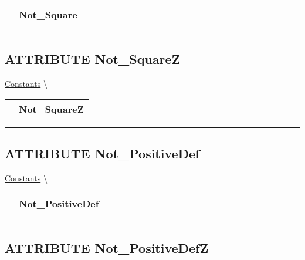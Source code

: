 {\renewcommand{\arraystretch}{1.5}
\begin{tabularx}{\textwidth}{|>{\raggedright\arraybackslash}l|X|}
\hline
\hspace{0pt}\mytexttt{\color{red} } & \textbf{Not\_Square} \\
\hline
\end{tabularx}
}

\par


\rule{\linewidth}{0.5pt}
\subsection*{\textsf{\colorbox{headtoc}{\color{white} ATTRIBUTE}
Not\_SquareZ}}

\hypertarget{ecldoc:pbblas.constants.not_squarez}{}
\hspace{0pt} \hyperlink{ecldoc:PBblas.Constants}{Constants} \textbackslash 

{\renewcommand{\arraystretch}{1.5}
\begin{tabularx}{\textwidth}{|>{\raggedright\arraybackslash}l|X|}
\hline
\hspace{0pt}\mytexttt{\color{red} } & \textbf{Not\_SquareZ} \\
\hline
\end{tabularx}
}

\par


\rule{\linewidth}{0.5pt}
\subsection*{\textsf{\colorbox{headtoc}{\color{white} ATTRIBUTE}
Not\_PositiveDef}}

\hypertarget{ecldoc:pbblas.constants.not_positivedef}{}
\hspace{0pt} \hyperlink{ecldoc:PBblas.Constants}{Constants} \textbackslash 

{\renewcommand{\arraystretch}{1.5}
\begin{tabularx}{\textwidth}{|>{\raggedright\arraybackslash}l|X|}
\hline
\hspace{0pt}\mytexttt{\color{red} } & \textbf{Not\_PositiveDef} \\
\hline
\end{tabularx}
}

\par


\rule{\linewidth}{0.5pt}
\subsection*{\textsf{\colorbox{headtoc}{\color{white} ATTRIBUTE}
Not\_PositiveDefZ}}

